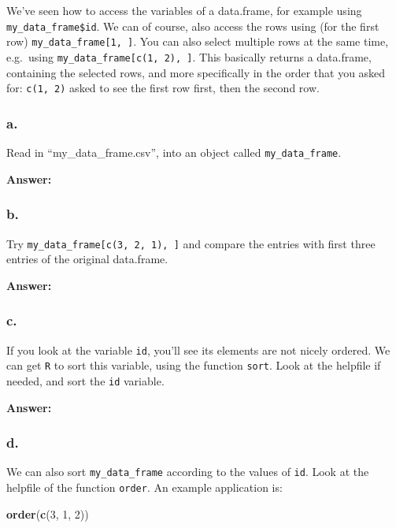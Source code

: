\documentclass[]{article}
\newenvironment{Shaded}{\begin{snugshade}}{\end{snugshade}}
\newcommand{\DecValTok}[1]{\textcolor[rgb]{0.00,0.00,0.81}{#1}}
\newcommand{\KeywordTok}[1]{\textcolor[rgb]{0.13,0.29,0.53}{\textbf{#1}}}
\newcommand{\NormalTok}[1]{#1}
\begin{document}
We've seen how to access the variables of a data.frame, for example
using \texttt{my\_data\_frame\$id}. We can of course, also access the
rows using (for the first row) \texttt{my\_data\_frame{[}1,\ {]}}. You
can also select multiple rows at the same time, e.g.~using
\texttt{my\_data\_frame{[}c(1,\ 2),\ {]}}. This basically returns a
data.frame, containing the selected rows, and more specifically in the
order that you asked for: \texttt{c(1,\ 2)} asked to see the first row
first, then the second row.

\hypertarget{a.-6}{%
\subsubsection{a.}\label{a.-6}}

Read in ``my\_data\_frame.csv'', into an object called
\texttt{my\_data\_frame}.

\textbf{Answer:}

\hypertarget{b.-6}{%
\subsubsection{b.}\label{b.-6}}

Try \texttt{my\_data\_frame{[}c(3,\ 2,\ 1),\ {]}} and compare the
entries with first three entries of the original data.frame.

\textbf{Answer:}

\hypertarget{c.-6}{%
\subsubsection{c.}\label{c.-6}}

If you look at the variable \texttt{id}, you'll see its elements are not
nicely ordered. We can get \texttt{R} to sort this variable, using the
function \texttt{sort}. Look at the helpfile if needed, and sort the
\texttt{id} variable.

\textbf{Answer:}

\hypertarget{d.-6}{%
\subsubsection{d.}\label{d.-6}}

We can also sort \texttt{my\_data\_frame} according to the values of
\texttt{id}. Look at the helpfile of the function \texttt{order}. An
example application is:

\begin{Shaded}
\begin{Highlighting}[]
\KeywordTok{order}\NormalTok{(}\KeywordTok{c}\NormalTok{(}\DecValTok{3}\NormalTok{, }\DecValTok{1}\NormalTok{, }\DecValTok{2}\NormalTok{))}
\end{Highlighting}
\end{Shaded}
\end{document}
